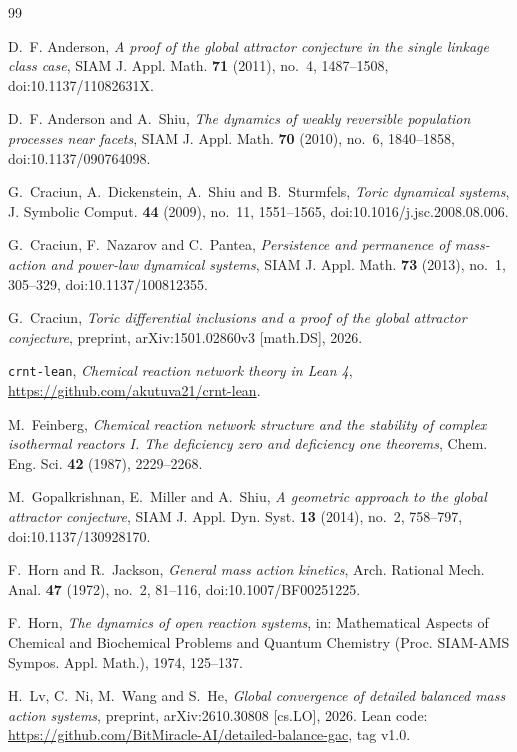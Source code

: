 \documentclass[11pt]{article}
\newcommand{\lean}[1]{\texttt{#1}}
\theoremstyle{plain}
\theoremstyle{definition}
\theoremstyle{remark}
\begin{document}
\begin{thebibliography}{99}

D.~F. Anderson, \emph{A proof of the global attractor conjecture in the single linkage class case}, SIAM J. Appl. Math. \textbf{71} (2011), no.~4, 1487--1508, doi:10.1137/11082631X.

D.~F. Anderson and A.~Shiu, \emph{The dynamics of weakly reversible population processes near facets}, SIAM J. Appl. Math. \textbf{70} (2010), no.~6, 1840--1858, doi:10.1137/090764098.

G.~Craciun, A.~Dickenstein, A.~Shiu and B.~Sturmfels, \emph{Toric dynamical systems}, J. Symbolic Comput. \textbf{44} (2009), no.~11, 1551--1565, doi:10.1016/j.jsc.2008.08.006.

G.~Craciun, F.~Nazarov and C.~Pantea, \emph{Persistence and permanence of mass-action and power-law dynamical systems}, SIAM J. Appl. Math. \textbf{73} (2013), no.~1, 305--329, doi:10.1137/100812355.

G.~Craciun, \emph{Toric differential inclusions and a proof of the global attractor conjecture}, preprint, arXiv:1501.02860v3 [math.DS], 2026.

\lean{crnt-lean}, \emph{Chemical reaction network theory in Lean 4}, \url{https://github.com/akutuva21/crnt-lean}.

M.~Feinberg, \emph{Chemical reaction network structure and the stability of complex isothermal reactors I. The deficiency zero and deficiency one theorems}, Chem. Eng. Sci. \textbf{42} (1987), 2229--2268.

M.~Gopalkrishnan, E.~Miller and A.~Shiu, \emph{A geometric approach to the global attractor conjecture}, SIAM J. Appl. Dyn. Syst. \textbf{13} (2014), no.~2, 758--797, doi:10.1137/130928170.

F.~Horn and R.~Jackson, \emph{General mass action kinetics}, Arch. Rational Mech. Anal. \textbf{47} (1972), no.~2, 81--116, doi:10.1007/BF00251225.

F.~Horn, \emph{The dynamics of open reaction systems}, in: Mathematical Aspects of Chemical and Biochemical Problems and Quantum Chemistry (Proc. SIAM-AMS Sympos. Appl. Math.), 1974, 125--137.

H.~Lv, C.~Ni, M.~Wang and S.~He, \emph{Global convergence of detailed balanced mass action systems}, preprint, arXiv:2610.30808 [cs.LO], 2026. Lean code: \url{https://github.com/BitMiracle-AI/detailed-balance-gac}, tag v1.0.


\end{thebibliography}
\end{document}
